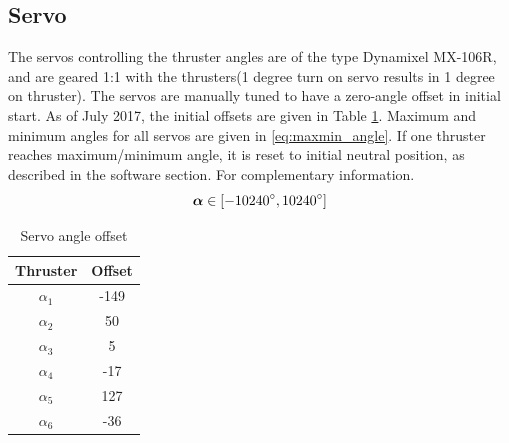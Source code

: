 \subsection{Servo}
The servos controlling the thruster angles are of the type Dynamixel MX-106R, and are geared 1:1 with the thrusters(1 degree turn on servo results in 1 degree on thruster). The servos are manually tuned to have a zero-angle offset in initial start. As of July 2017, the initial offsets are given in Table \ref{tab:angle_offset}. Maximum and minimum angles for all servos are given in \eqref{eq:maxmin_angle}. If one thruster reaches maximum/minimum angle, it is reset to initial neutral position, as described in the software section. For complementary information.  
\begin{equation}\label{eq:maxmin_angle}
	\bm{\alpha} \in [-10240\degree, 10240\degree]
\end{equation}
\begin{table}[htb!]
	\centering
	\caption{Servo angle offset}
	\begin{tabular}{cc}
		\hline
		\textbf{Thruster} & \textbf{Offset}\\ \hline
		$\alpha_1$ & -149\degree\\
		$\alpha_2$ & 50\degree\\
		$\alpha_3$ & 5\degree\\
		$\alpha_4$ & -17\degree\\
		$\alpha_5$ & 127\degree\\
		$\alpha_6$ & -36\degree\\
		\hline
	\end{tabular}
\label{tab:angle_offset}
\end{table}

